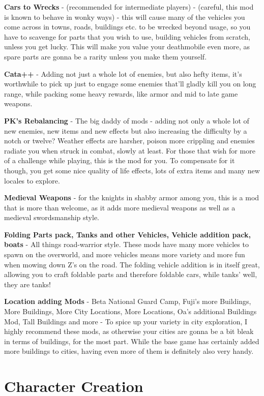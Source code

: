 \documentclass[11pt]{report}
\begin{document}
\textbf{Cars to Wrecks} - (recommended for intermediate players) -
(careful, this mod is known to behave in wonky ways) - this will cause many of the vehicles you come across in towns, roads, buildings etc. to be wrecked beyond usage, so you have to scavenge for parts that you wish to use, building vehicles from scratch, unless you get lucky. This will make you value your deathmobile even more, as spare parts are gonna be a rarity unless you make them yourself.

\textbf{Cata++} - Adding not just a whole lot of enemies, but also hefty items, it's worthwhile to pick up just to engage some enemies that'll gladly kill you on long range, while packing some heavy rewards, like armor and mid to late game weapons.

\textbf{PK's Rebalancing} - The big daddy of mods - adding not only a whole lot of new enemies, new items and new effects but also increasing the difficulty by a notch or twelve? Weather effects are harsher, poison more crippling and enemies radiate you when struck in combat, slowly at least. For those that wish for more of a challenge while playing, this is the mod for you. To compensate for it though, you get some nice quality of life effects, lots of extra items and many new locales to explore.

\textbf{Medieval Weapons} - for the knights in shabby armor among you, this is a mod that is more than welcome, as it adds more medieval weapons as well as a medieval swordsmanship style.

\textbf{Folding Parts pack, Tanks and other Vehicles, Vehicle addition pack, boats} - All things road-warrior style. These mods have many more vehicles to spawn on the overworld, and more vehicles means more variety and more fun when mowing down Z's on the road. The folding vehicle addition is in itself great, allowing you to craft foldable parts and therefore foldable cars, while tanks' well, they are tanks!

\textbf{Location adding Mods} - Beta National Guard Camp, Fuji's more Buildings, More Buildings, More City Locations, More Locations, Oa's additional Buildings Mod, Tall Buildings and more - To spice up your variety in city exploration, I highly recommend these mods, as otherwise your cities are gonna be a bit bleak in terms of buildings, for the most part. While the base game has certainly added more buildings to cities, having even more of them is definitely also very handy.

\chapter{Character Creation}
\end{document}
